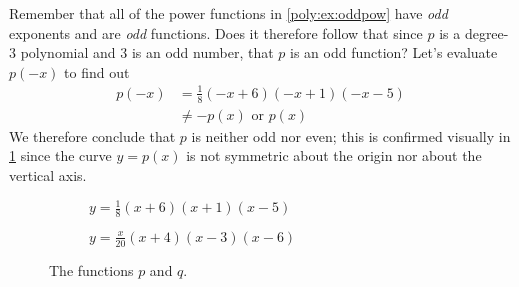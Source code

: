 \begin{pccexample}
\begin{pccsolution}
\begin{enumerate}
			Remember that all of the power functions in \cref{poly:ex:oddpow} 
			have \emph{odd} exponents and are \emph{odd} functions. Does it therefore
			follow that since $p$ is a degree-$3$ polynomial and $3$ is an odd number, 
			that $p$ is an odd function? Let's evaluate $p(-x)$ to find out
			\begin{align*}
				p(-x) & =\frac{1}{8}(-x+6)(-x+1)(-x-5) \\ 
				      & \ne -p(x) \text{ or } p(x)     
			\end{align*}
			We therefore conclude that $p$ is neither odd nor even; this is confirmed visually in 
			\cref{poly:fig:detailed1} since the curve $y=p(x)$ is not symmetric about the origin 
			nor about the vertical axis.
				
			\begin{figure}[!htb]
				\setlength{\figurewidth}{.4\textwidth}
				\begin{subfigure}{\figurewidth}
					\caption{$y=\frac{1}{8}(x+6)(x+1)(x-5)$}
					\label{poly:fig:detailed1}
				\end{subfigure}
				\hfill
				\begin{subfigure}{\figurewidth}
					\caption{$y=\frac{x}{20}(x+4)(x-3)(x-6)$}
					\label{poly:fig:detailed2}
				\end{subfigure}
				\caption{The functions $p$ and $q$.}

\end{figure}
\end{enumerate}
\end{pccsolution}
\end{pccexample}
